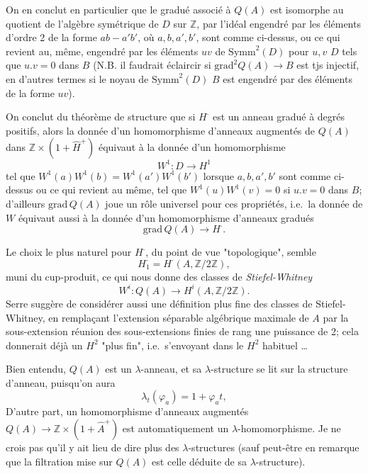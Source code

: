 \documentclass[11pt,a4paper]{article}
\begin{document}
On en conclut en particulier que le gradué associé à $Q(A)$ est isomorphe
au quotient de l'algèbre symétrique de $D$ sur $\mathbb{Z}$, par l'idéal
engendré par les éléments d'ordre 2 de la forme $ab - a'b'$, où $a, b, a',
b'$, sont comme ci-dessus, ou ce qui revient au, même, engendré par les
éléments $uv$ de $\mathrm{Symm}^2(D)$ pour $u, v$ $D$ tels que $u.v = 0$
dans $B$ (N.B. il faudrait éclaircir si $\mathrm{grad}^2 Q(A) \to B$ est
tjs injectif, en d'autres termes si le noyau de
$\mathrm{Symm}^2(D)$ $B$ est engendré par des éléments de la forme $uv$).

On conclut du théorème de structure que si $H^{\cdot}$ est un anneau gradué
à degrés positifs, alors la donnée d'un homomorphisme 
d'anneaux augmentés de $Q(A)$ dans $\mathbb{Z} \times (1 + \hat
H^{+})$ équivaut à la donnée d'un homomorphisme
\[
W^1 : D \longrightarrow H^1
\]
tel que $W^1(a) W^1(b) = W^1(a') W^1(b')$ lorsque $a, b, a', b'$ sont comme
ci-dessus ou ce qui revient au même, tel que $W^1(u) W^1(v) = 0$ si
$u.v = 0$ dans $B$; d'ailleurs $\mathrm{grad}\, Q(A)$ joue un rôle
universel pour ces propriétés, i.e.\ la donnée de $W$ équivaut aussi à la
donnée d'un homomorphisme d'anneaux gradués
\[
\mathrm{grad}\, Q(A) \to H^{\cdot} .
\]

Le choix le plus naturel pour $H^{\cdot}$, du point de vue "topologique",
semble
\[
H^{\cdot}_{1} = H^{\cdot}(A, \mathbb{Z}/2\mathbb{Z}) ,
\]
muni du cup-produit, ce qui nous donne des classes de
\emph{Stiefel-Whitney}
\[
W^i : Q(A) \to H^i(A, \mathbb{Z}/2\mathbb{Z}) .
\]
Serre suggère de considérer aussi une définition plus fine des classes de
Stiefel-Whitney, en remplaçant l'extension séparable algébrique maximale de
$A$ par la sous-extension réunion des sous-extensions finies de rang une
puissance de 2; cela donnerait déjà un $H^2$ "plus fin", i.e.\ s'envoyant
dans le $H^2$ habituel \ldots
{}


Bien entendu, $Q(A)$ est un $\lambda$-anneau, et sa $\lambda$-structure se
lit sur la structure d'anneau, puisqu'on aura
\[
\lambda_t(\varphi_a) = 1 + \varphi_a t ,
\]
D'autre part, un homomorphisme d'anneaux augmentés $Q(A) \to \mathbb{Z}
\times (1 + \hat A^{+})$ est automatiquement un $\lambda$-homomorphisme. Je
ne crois pas qu'il y ait lieu de dire plus des $\lambda$-structures (sauf
peut-être en remarque que la filtration mise sur $Q(A)$ est celle déduite
de sa $\lambda$-structure).
\end{document}
